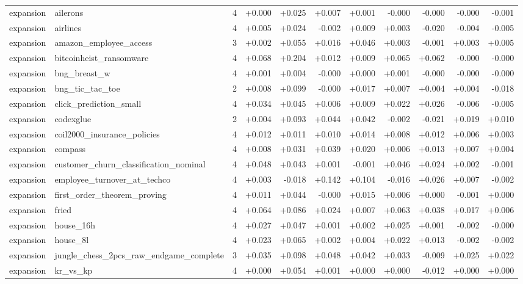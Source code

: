 \begin{table}[htbp]
\begin{adjustbox}{max width=\linewidth}
\begin{tabular}{llrrrrrrrrr}
expansion & ailerons & 4 & +0.000 & +0.025 & +0.007 & +0.001 & -0.000 & -0.000 & -0.000 & -0.001 \\
expansion & airlines & 4 & +0.005 & +0.024 & -0.002 & +0.009 & +0.003 & -0.020 & -0.004 & -0.005 \\
expansion & amazon\_employee\_access & 3 & +0.002 & +0.055 & +0.016 & +0.046 & +0.003 & -0.001 & +0.003 & +0.005 \\
expansion & bitcoinheist\_ransomware & 4 & +0.068 & +0.204 & +0.012 & +0.009 & +0.065 & +0.062 & -0.000 & -0.000 \\
expansion & bng\_breast\_w & 4 & +0.001 & +0.004 & -0.000 & +0.000 & +0.001 & -0.000 & -0.000 & -0.000 \\
expansion & bng\_tic\_tac\_toe & 2 & +0.008 & +0.099 & -0.000 & +0.017 & +0.007 & +0.004 & +0.004 & -0.018 \\
expansion & click\_prediction\_small & 4 & +0.034 & +0.045 & +0.006 & +0.009 & +0.022 & +0.026 & -0.006 & -0.005 \\
expansion & codexglue & 2 & +0.004 & +0.093 & +0.044 & +0.042 & -0.002 & -0.021 & +0.019 & +0.010 \\
expansion & coil2000\_insurance\_policies & 4 & +0.012 & +0.011 & +0.010 & +0.014 & +0.008 & +0.012 & +0.006 & +0.003 \\
expansion & compass & 4 & +0.008 & +0.031 & +0.039 & +0.020 & +0.006 & +0.013 & +0.007 & +0.004 \\
expansion & customer\_churn\_classification\_nominal & 4 & +0.048 & +0.043 & +0.001 & -0.001 & +0.046 & +0.024 & +0.002 & -0.001 \\
expansion & employee\_turnover\_at\_techco & 4 & +0.003 & -0.018 & +0.142 & +0.104 & -0.016 & +0.026 & +0.007 & -0.002 \\
expansion & first\_order\_theorem\_proving & 4 & +0.011 & +0.044 & -0.000 & +0.015 & +0.006 & +0.000 & -0.001 & +0.000 \\
expansion & fried & 4 & +0.064 & +0.086 & +0.024 & +0.007 & +0.063 & +0.038 & +0.017 & +0.006 \\
expansion & house\_16h & 4 & +0.027 & +0.047 & +0.001 & +0.002 & +0.025 & +0.001 & -0.002 & -0.000 \\
expansion & house\_8l & 4 & +0.023 & +0.065 & +0.002 & +0.004 & +0.022 & +0.013 & -0.002 & -0.002 \\
expansion & jungle\_chess\_2pcs\_raw\_endgame\_complete & 3 & +0.035 & +0.098 & +0.048 & +0.042 & +0.033 & -0.009 & +0.025 & +0.022 \\
expansion & kr\_vs\_kp & 4 & +0.000 & +0.054 & +0.001 & +0.000 & +0.000 & -0.012 & +0.000 & +0.000 \\

\end{tabular}
\end{adjustbox}
\end{table}

